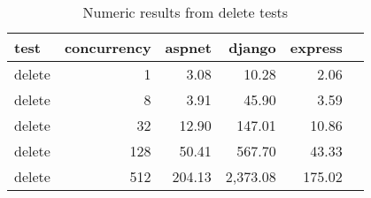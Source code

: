 \FloatBarrier
\begin{table}[!htp]\centering
    \caption{Numeric results from delete tests}\label{tab:resultsDelete}
    \scriptsize
    \begin{tabular}{lrrrrr}\toprule
        test   & concurrency & aspnet & django   & express \\\midrule
        delete & 1           & 3.08   & 10.28    & 2.06    \\
        delete & 8           & 3.91   & 45.90    & 3.59    \\
        delete & 32          & 12.90  & 147.01   & 10.86   \\
        delete & 128         & 50.41  & 567.70   & 43.33   \\
        delete & 512         & 204.13 & 2,373.08 & 175.02  \\
        \bottomrule
    \end{tabular}
\end{table}
\FloatBarrier
